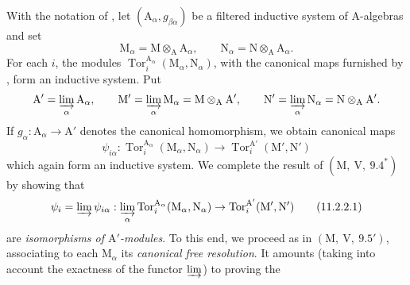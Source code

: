 \begin{env}[11.2.2]
\label{IV.11.2.2}
With the notation of , let
$(\mathrm{A}_\alpha,g_{\beta\alpha})$ be a filtered inductive system of
$\mathrm{A}$-algebras and set
\[
  \mathrm{M}_\alpha=\mathrm{M}\otimes_\mathrm{A}\mathrm{A}_\alpha,
  \qquad
  \mathrm{N}_\alpha=\mathrm{N}\otimes_\mathrm{A}\mathrm{A}_\alpha.
\]
For each $i$, the modules
$\operatorname{Tor}_i^{\mathrm{A}_\alpha}
(\mathrm{M}_\alpha,\mathrm{N}_\alpha)$, with the canonical maps furnished
by , form an inductive system. Put
\[
  \mathrm{A}'=\varinjlim_\alpha\mathrm{A}_\alpha,\qquad
  \mathrm{M}'=\varinjlim_\alpha\mathrm{M}_\alpha
    =\mathrm{M}\otimes_\mathrm{A}\mathrm{A}',\qquad
  \mathrm{N}'=\varinjlim_\alpha\mathrm{N}_\alpha
    =\mathrm{N}\otimes_\mathrm{A}\mathrm{A}'.
\]
If $g_\alpha:\mathrm{A}_\alpha\to\mathrm{A}'$ denotes the canonical
homomorphism, we obtain canonical maps
\[
  \psi_{i\alpha}:
  \operatorname{Tor}_i^{\mathrm{A}_\alpha}
    (\mathrm{M}_\alpha,\mathrm{N}_\alpha)
  \longrightarrow
  \operatorname{Tor}_i^{\mathrm{A}'}(\mathrm{M}',\mathrm{N}')
\]
which again form an inductive system. We complete the result of
$(\mathrm{M},~\mathrm{V},~9.4^*)$ by showing that
\begin{equation}
  \psi_i=\varinjlim\psi_{i\alpha}:\varinjlim_\alpha\operatorname{Tor}_i^{\mathrm{A}_\alpha}(\mathrm{M}_\alpha,\mathrm{N}_\alpha)\to\operatorname{Tor}_i^{\mathrm{A}'}(\mathrm{M}',\mathrm{N}')
  \tag{11.2.2.1}
\end{equation}
are \emph{isomorphisms of $\mathrm{A}'$-modules}. To this end, we proceed as in $(\mathrm{M},~\mathrm{V},~9.5')$, associating to each $\mathrm{M}_\alpha$ its \emph{canonical free resolution}. It amounts (taking into account the exactness of the functor $\varinjlim$) to proving the
\end{env}


